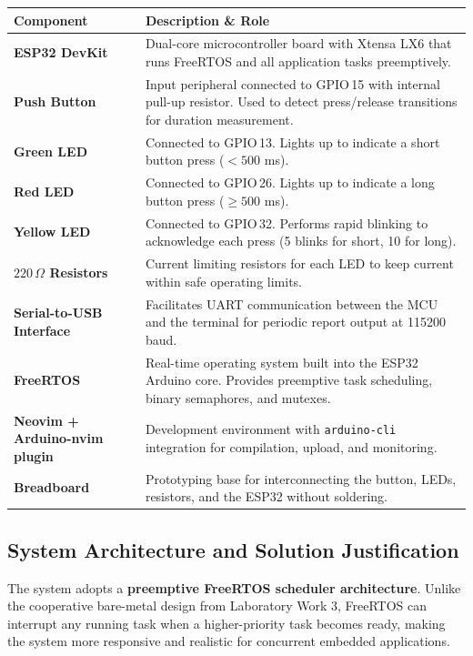 \begin{center}
\begin{tabular}{| p{4cm} | p{10cm} |}
\hline
\textbf{Component} & \textbf{Description \& Role} \\ \hline
\textbf{ESP32 DevKit} & Dual-core microcontroller board with Xtensa LX6 that runs FreeRTOS and
  all application tasks preemptively. \\ \hline
\textbf{Push Button} & Input peripheral connected to GPIO\,15 with internal pull-up resistor.
  Used to detect press/release transitions for duration measurement. \\ \hline
\textbf{Green LED} & Connected to GPIO\,13. Lights up to indicate a short button press ($< 500$ ms). \\ \hline
\textbf{Red LED} & Connected to GPIO\,26. Lights up to indicate a long button press ($\geq 500$ ms). \\ \hline
\textbf{Yellow LED} & Connected to GPIO\,32. Performs rapid blinking to acknowledge each press
  (5 blinks for short, 10 for long). \\ \hline
\textbf{$220\,\Omega$ Resistors} & Current limiting resistors for each LED to keep current within
  safe operating limits. \\ \hline
\textbf{Serial-to-USB Interface} & Facilitates UART communication between the MCU and the terminal
  for periodic report output at 115200 baud. \\ \hline
\textbf{FreeRTOS} & Real-time operating system built into the ESP32 Arduino core. Provides
  preemptive task scheduling, binary semaphores, and mutexes. \\ \hline
\textbf{Neovim + Arduino-nvim plugin} & Development environment with \texttt{arduino-cli} integration
  for compilation, upload, and monitoring. \\ \hline
\textbf{Breadboard} & Prototyping base for interconnecting the button, LEDs, resistors, and the
  ESP32 without soldering. \\ \hline
\end{tabular}
\end{center}

\subsection{System Architecture and Solution Justification}
The system adopts a \textbf{preemptive FreeRTOS scheduler architecture}. Unlike the cooperative
bare-metal design from Laboratory Work 3, FreeRTOS can interrupt any running task when a higher-priority
task becomes ready, making the system more responsive and realistic for concurrent embedded applications.

